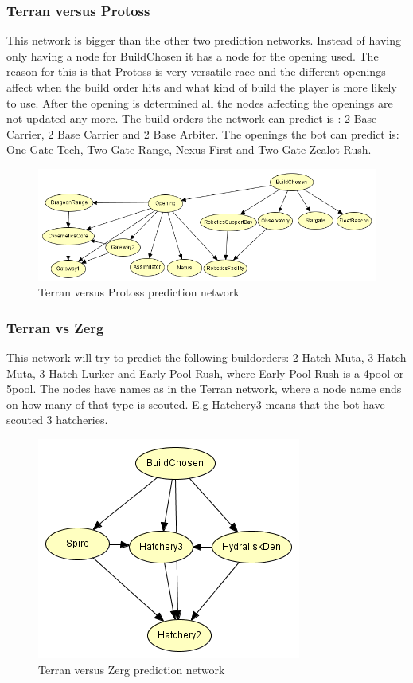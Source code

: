 \subsubsection{Terran versus Protoss}
	This network is bigger than the other two prediction networks. Instead of having only having a node for BuildChosen it has a node for the opening 
	used. The reason for this is that Protoss is very versatile race and the different openings affect when the build order hits and what kind of build 
	the player is more likely to use. After the opening is determined all the nodes affecting the openings are not updated any more. The build orders 
	the network can predict is : 2 Base Carrier, 2 Base Carrier and 2 Base Arbiter. The openings the bot can predict is: One Gate Tech, Two Gate Range, 
	Nexus First and Two Gate Zealot Rush.

\begin{figure}[H]
	\includegraphics[scale=0.7]{Figures/BayesianPictures/tvp.png}
	\caption{Terran versus Protoss prediction network}
	\label{fig:tvpnetwork}
\end{figure}	

\subsubsection{Terran vs Zerg}
	This network will try to predict the following buildorders: 2 Hatch Muta, 3 Hatch Muta, 3 Hatch Lurker and Early Pool Rush, 
	where Early Pool Rush is a 4pool or 5pool. The nodes have names as in the Terran network, where a node name ends on how many of that type is scouted. 
	E.g Hatchery3 means that the bot have scouted 3 hatcheries.

\begin{figure}[H]
	\includegraphics[scale=1]{Figures/BayesianPictures/tvz.png}
	\caption{Terran versus Zerg prediction network}
	\label{fig:tvznetwork}
\end{figure}	
		
